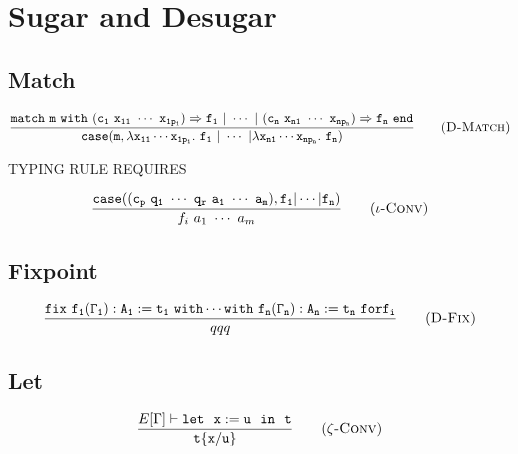 \section{Sugar and Desugar}

\subsection{Match}
\begin{Def}
    \begin{equation*}
    \frac{\tt match\ m\ with\ (c_1\ x_{11}\ \cdots\ x_{1p_1})\Rightarrow f_1\ |\ \cdots\ |\ (c_n\ x_{n1}\ \cdots\ x_{np_n})
        \Rightarrow f_n\ end}
        {\tt case(m,\lambda x_{11}\cdots x_{1p_1}.\ f_1\ |\ \cdots\ |\lambda x_{n1}\cdots x_{np_n}.\ f_n)}
        \tag{\sc D-Match}
    \end{equation*}
\end{Def}

TYPING RULE REQUIRES

\begin{equation*}
\frac{\tt case((c_p\ q_1\ \cdots\ q_r\ a_1\ \cdots\ a_m),f_1|\cdots|f_n)}
    {f_i\ a_1\ \cdots\ a_m}
    \tag{\sc $\iota$-Conv}
\end{equation*}

\subsection{Fixpoint}
\begin{Def}
    \begin{equation*}
    \frac{\tt fix\ f_1(\Gamma_1):A_1:=t_1\ with\cdots with\ f_n(\Gamma_n):A_n:=t_n\ for f_i}
        {qqq}
        \tag{\sc D-Fix}
    \end{equation*}
\end{Def}

\subsection{Let}

\begin{Def}
\begin{equation*}
\frac{E[\Gamma]\vdash \tt let\ \ x:=u\ \ in\ \ t}
    {\tt t\{x/u\}}
    \tag{\sc $\zeta$-Conv}
\end{equation*}
\end{Def}
